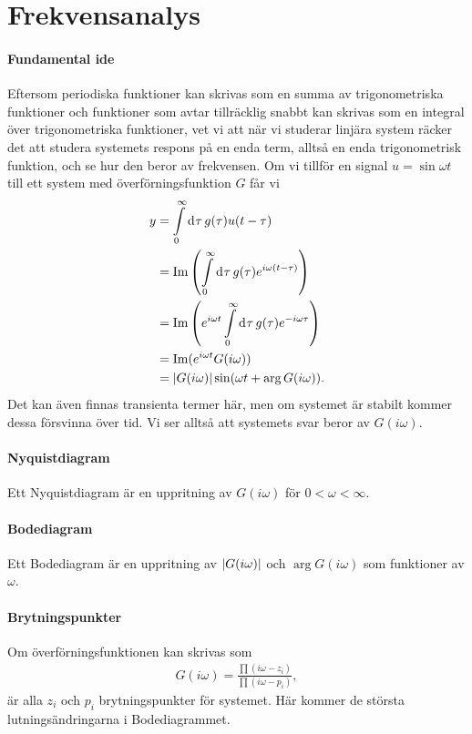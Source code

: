 \section{Frekvensanalys}

\paragraph{Fundamental ide}
Eftersom periodiska funktioner kan skrivas som en summa av trigonometriska funktioner och funktioner som avtar tillräcklig snabbt kan skrivas som en integral över trigonometriska funktioner, vet vi att när vi studerar linjära system räcker det att studera systemets respons på en enda term, alltså en enda trigonometrisk funktion, och se hur den beror av frekvensen. Om vi tillför en signal $u = \sin{\omega t}$ till ett system med överförningsfunktion $G$ får vi
\begin{align*}
	y &= \int\limits_{0}^{\infty}\dd[]{\tau}g(\tau)u(t - \tau) \\
	  &= \Im\left(\int\limits_{0}^{\infty}\dd[]{\tau}g(\tau)e^{i\omega(t - \tau)}\right) \\
	  &= \Im\left(e^{i\omega t}\int\limits_{0}^{\infty}\dd[]{\tau}g(\tau)e^{-i\omega\tau}\right) \\
	  &= \Im(e^{i\omega t}G(i\omega)) \\
	  &= \abs{G(i\omega)}\sin(\omega t + \arg{G(i\omega)}).
\end{align*}
Det kan även finnas transienta termer här, men om systemet är stabilt kommer dessa försvinna över tid. Vi ser alltså att systemets svar beror av $G(i\omega)$.

\paragraph{Nyquistdiagram}
Ett Nyquistdiagram är en uppritning av $G(i\omega)$ för $0 < \omega < \infty$.

\paragraph{Bodediagram}
Ett Bodediagram är en uppritning av $\abs{G(i\omega)}$ och $\arg{G(i\omega)}$ som funktioner av $\omega$.

\paragraph{Brytningspunkter}
Om överförningsfunktionen kan skrivas som
\begin{align*}
	G(i\omega) = \frac{\prod(i\omega - z_{i})}{\prod(i\omega - p_{i})},
\end{align*}
är alla $z_{i}$ och $p_{i}$ brytningspunkter för systemet. Här kommer de största lutningsändringarna i Bodediagrammet.

